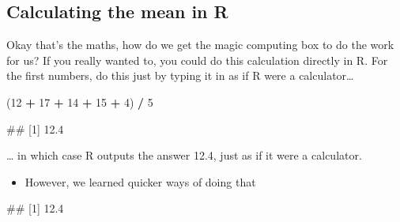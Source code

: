 \documentclass[
]{book}
\newenvironment{Shaded}{\begin{snugshade}}{\end{snugshade}}
\newcommand{\CommentTok}[1]{\textcolor[rgb]{0.56,0.35,0.01}{\textit{#1}}}
\newcommand{\DecValTok}[1]{\textcolor[rgb]{0.00,0.00,0.81}{#1}}
\newcommand{\FunctionTok}[1]{\textcolor[rgb]{0.13,0.29,0.53}{\textbf{#1}}}
\newcommand{\NormalTok}[1]{#1}
\newcommand{\SpecialCharTok}[1]{\textcolor[rgb]{0.81,0.36,0.00}{\textbf{#1}}}
\providecommand{\tightlist}{%
  \setlength{\itemsep}{0pt}\setlength{\parskip}{0pt}}
\begin{document}
\subsection{Calculating the mean in R}\label{calculating-the-mean-in-r}

Okay that's the maths, how do we get the magic computing box to do the work for us? If you really wanted to, you could do this calculation directly in R. For the first numbers, do this just by typing it in as if R were a calculator\ldots{}

\begin{Shaded}
\begin{Highlighting}[]
\NormalTok{(}\DecValTok{12} \SpecialCharTok{+} \DecValTok{17} \SpecialCharTok{+} \DecValTok{14} \SpecialCharTok{+} \DecValTok{15} \SpecialCharTok{+} \DecValTok{4}\NormalTok{) }\SpecialCharTok{/} \DecValTok{5}
\end{Highlighting}
\end{Shaded}

\begin{Shaded}
\begin{Highlighting}[]
\NormalTok{\#\# [1] 12.4}
\end{Highlighting}
\end{Shaded}

\ldots{} in which case R outputs the answer 12.4, just as if it were a calculator.

\begin{itemize}
\tightlist
\item
  However, we learned quicker ways of doing that
\end{itemize}

\begin{Shaded}
\end{Shaded}

\begin{Shaded}
\begin{Highlighting}[]
\NormalTok{\#\# [1] 12.4}
\end{Highlighting}
\end{Shaded}

\begin{Shaded}
\end{Shaded}
\end{document}
